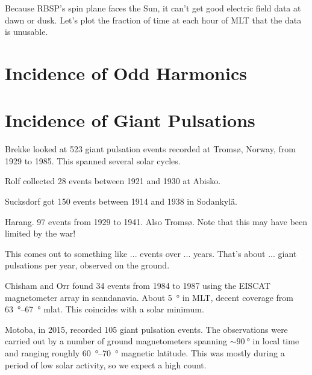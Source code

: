Because RBSP's spin plane faces the Sun, it can't get good electric field data at dawn or dusk. Let's plot the fraction of time at each hour of MLT that the data is unusable. 

\section{Incidence of Odd Harmonics}



\section{Incidence of Giant Pulsations}





Brekke\cite{brekke_1987} looked at 523 giant pulsation events recorded at Troms{\o}, Norway, from 1929 to 1985. This spanned several solar cycles. 

Rolf\cite{rolf_1931} collected 28 events between 1921 and 1930 at Abisko. 

Sucksdorf\cite{sucksdorff_1939} got 150 events between 1914 and 1938 in Sodankyl{\"a}. 

Harang\cite{harang_1941}. 97 events from 1929 to 1941. Also Troms{\o}. Note that this may have been limited by the war! 

This comes out to something like ... events over ... years. That's about ... giant pulsations per year, observed on the ground. 


Chisham and Orr\cite{chisham_1991} found 34 events from 1984 to 1987 using the EISCAT magnetometer array in scandanavia. About \SI{5}{\degree} in MLT, decent coverage from \SIrange{63}{67}{\degree} mlat. This coincides with a solar minimum. 

Motoba, in 2015, recorded 105 giant pulsation events. The observations were carried out by a number of ground magnetometers spanning $\sim \SI{90}{\degree}$ in local time and ranging roughly \SIrange{60}{70}{\degree} magnetic latitude\cite{motoba_2015}. This was mostly during a period of low solar activity, so we expect a high count. 


